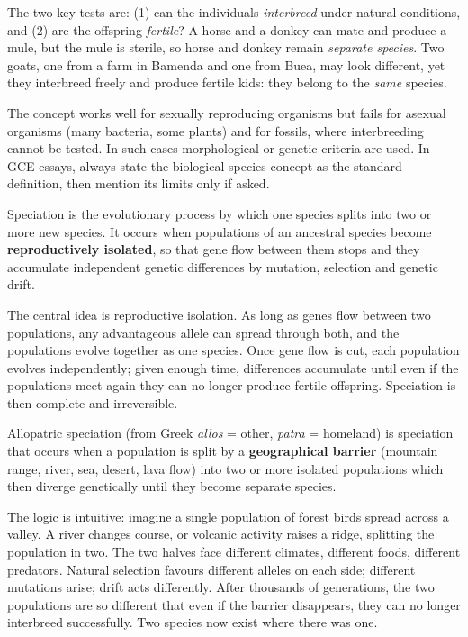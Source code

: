 \documentclass[11pt]{article}
\newcommand{\cle}[1]{{\popxbold\color{popdark}#1}}
\newcounter{popsec}
\newcounter{popsub}
\newcommand{\courssub}[1]{%
  \stepcounter{popsub}%
  \par\vspace{9pt}\noindent{\popxbold\fontsize{11.5}{13}\selectfont\color{popink}{\color{poporange}\thepopsec.\thepopsub}\hspace{6pt}#1}\par\nopagebreak\vspace{4pt}
}
\begin{document}
The two key tests are: (1) can the individuals \emph{interbreed} under natural conditions, and (2) are the offspring \emph{fertile}? A horse and a donkey can mate and produce a mule, but the mule is sterile, so horse and donkey remain \emph{separate species}. Two goats, one from a farm in Bamenda and one from Buea, may look different, yet they interbreed freely and produce fertile kids: they belong to the \emph{same} species.

\begin{attention}
The concept works well for sexually reproducing organisms but fails for asexual organisms (many bacteria, some plants) and for fossils, where interbreeding cannot be tested. In such cases morphological or genetic criteria are used. In GCE essays, always state the biological species concept as the standard definition, then mention its limits only if asked.
\end{attention}

\begin{definition}[Speciation]
\cle{Speciation} is the evolutionary process by which one species splits into two or more new species. It occurs when populations of an ancestral species become \textbf{reproductively isolated}, so that gene flow between them stops and they accumulate independent genetic differences by mutation, selection and genetic drift.
\end{definition}

The central idea is \cle{reproductive isolation}. As long as genes flow between two populations, any advantageous allele can spread through both, and the populations evolve together as one species. Once gene flow is cut, each population evolves independently; given enough time, differences accumulate until even if the populations meet again they can no longer produce fertile offspring. Speciation is then complete and irreversible.

\courssub{Allopatric Speciation}

\begin{definition}
\cle{Allopatric speciation} (from Greek \emph{allos} = other, \emph{patra} = homeland) is speciation that occurs when a population is split by a \textbf{geographical barrier} (mountain range, river, sea, desert, lava flow) into two or more isolated populations which then diverge genetically until they become separate species.
\end{definition}

The logic is intuitive: imagine a single population of forest birds spread across a valley. A river changes course, or volcanic activity raises a ridge, splitting the population in two. The two halves face different climates, different foods, different predators. Natural selection favours different alleles on each side; different mutations arise; drift acts differently. After thousands of generations, the two populations are so different that even if the barrier disappears, they can no longer interbreed successfully. Two species now exist where there was one.
\end{document}
